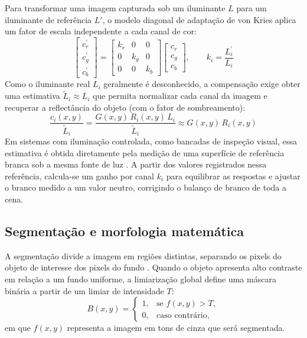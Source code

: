 Para transformar uma imagem capturada sob um iluminante \(L\) para um iluminante de referência \(L'\), o modelo diagonal de adaptação de von Kries aplica um fator de escala independente a cada canal de cor:
\[
\begin{bmatrix}
c_{r}^{\prime} \\
c_{g}^{\prime} \\
c_{b}^{\prime}
\end{bmatrix}
=
\begin{bmatrix}
k_{r} & 0 & 0 \\
0 & k_{g} & 0 \\
0 & 0 & k_{b}
\end{bmatrix}
\begin{bmatrix}
c_{r} \\
c_{g} \\
c_{b}
\end{bmatrix},
\qquad k_{i}=\frac{L_{i}^{\prime}}{L_{i}}
\]
Como o iluminante real \(L_{i}\) geralmente é desconhecido, a compensação exige obter uma estimativa \(\tilde{L}_i \approx L_i\) que permita normalizar cada canal da imagem e recuperar a reflectância do objeto (com o fator de sombreamento):
\[
\frac{c_{i}(x,y)}{\tilde{L}_{i}} = \frac{G(x,y)\,R_{i}(x,y)\,L_{i}}{\tilde{L}_{i}} \approx G(x,y)\,R_{i}(x,y)
\]
Em sistemas com iluminação controlada, como bancadas de inspeção visual, essa estimativa é obtida diretamente pela medição de uma superfície de referência branca sob a mesma fonte de luz \cite{ebner2007}. A partir dos valores registrados nessa referência, calcula-se um ganho por canal \(k_{i}\) para equilibrar as respostas e ajustar o branco medido a um valor neutro, corrigindo o balanço de branco de toda a cena.

\subsection{Segmentação e morfologia matemática}

A segmentação divide a imagem em regiões distintas, separando os pixels do objeto de interesse dos pixels do fundo \cite{gonzalez2010}. Quando o objeto apresenta alto contraste em relação a um fundo uniforme, a limiarização global define uma máscara binária a partir de um limiar de intensidade \(T\):
\[
B(x,y) =
\begin{cases}
1, & \text{se } f(x,y) > T, \\
0, & \text{caso contrário,}
\end{cases}
\]
em que \(f(x,y)\) representa a imagem em tons de cinza que será segmentada.

